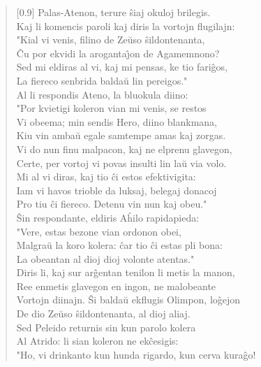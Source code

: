 \begin{verse}[0.9\textwidth]
          Palas-Atenon, terure \^siaj okuloj brilegis.\\
          \vin   Kaj li komencis paroli kaj diris la vortojn flugilajn:\\
          "Kial vi venis, filino de Ze\u uso \^sildontenanta,\\
          \^Cu por ekvidi la aroganta\^{\j}on de Agamemnono?\\
          Sed mi eldiras al vi, kaj mi pensas, ke tio fari\^gos,\\
          La fiereco senbrida balda\u u lin pereigos."\\
          Al li respondis Ateno, la bluokula diino:\\
          "Por kvietigi koleron vian mi venis, se restos\\
          Vi obeema; min sendis Hero, diino blankmana,\\
          Kiu vin amba\u u egale samtempe amas kaj zorgas.\\
          Vi do nun finu malpacon, kaj ne elprenu glavegon,\\
          Certe, per vortoj vi povas insulti lin la\u u via volo.\\
          Mi al vi diras, kaj tio \^ci estos efektivigita:\\
          Iam vi havos trioble da luksaj, belegaj donacoj\\
          Pro tiu \^ci fiereco. Detenu vin nun kaj obeu."\\
          \vin   \^Sin respondante, eldiris A\^hilo rapidapieda:\\
          "Vere, estas bezone vian ordonon obei,\\
          Malgra\u u la koro kolera: \^car tio \^ci estas pli bona:\\
          La obeantan al dioj dioj volonte atentas."\\
          \vin   Diris li, kaj sur ar\^gentan tenilon li metis la manon,\\
          Ree enmetis glavegon en ingon, ne malobeante\\
          Vortojn diinajn. \^Si balda\u u ekflugis Olimpon, lo\^gejon\\
          De dio Ze\u uso \^sildontenanta, al dioj aliaj.\\
          \vin   Sed Peleido returnis sin kun parolo kolera\\
          Al Atrido: li sian koleron ne ek\^cesigis:\\
          \vin "Ho, vi drinkanto kun hunda rigardo, kun cerva kura\^go!\\

\end{verse}
